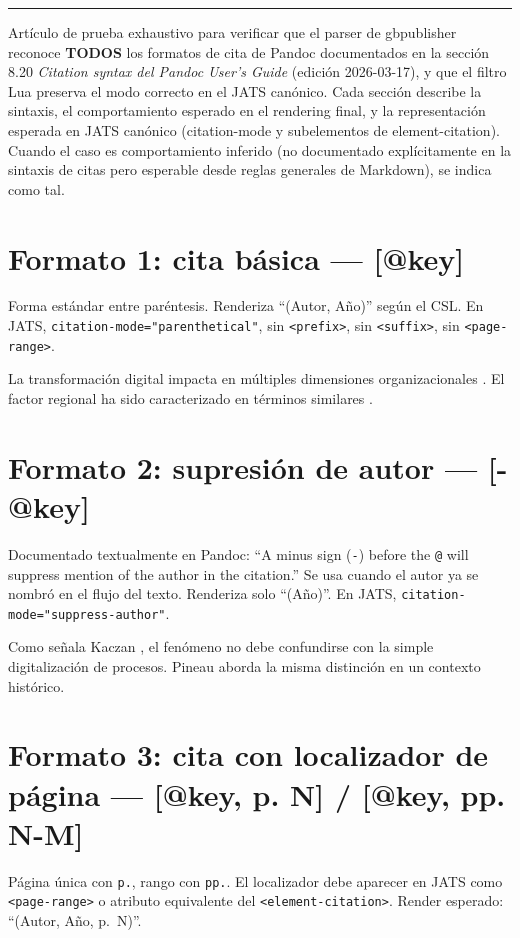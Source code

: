 \documentclass{article}
\begin{document}
\bigskip
\noindent\rule{\linewidth}{0.4pt}
\bigskip

Artículo de prueba exhaustivo para verificar que el parser de gbpublisher reconoce \textbf{TODOS} los formatos de cita de Pandoc documentados en la sección 8.20 \textit{Citation syntax del Pandoc User’s Guide} (edición 2026-03-17), y que el filtro Lua preserva el modo correcto en el JATS canónico. Cada sección describe la sintaxis, el comportamiento esperado en el rendering final, y la representación esperada en JATS canónico (citation-mode y subelementos de element-citation). Cuando el caso es comportamiento inferido (no documentado explícitamente en la sintaxis de citas pero esperable desde reglas generales de Markdown), se indica como tal.


\section{Formato 1: cita básica — [@key]}
Forma estándar entre paréntesis. Renderiza “(Autor, Año)” según el CSL. En JATS, \texttt{citation-mode="parenthetical"}, sin \texttt{<prefix>}, sin \texttt{<suffix>}, sin \texttt{<page-range>}.

La transformación digital impacta en múltiples dimensiones organizacionales \autocite{2961-KACZAN2016}. El factor regional ha sido caracterizado en términos similares \autocite{3036-ORBUCH2020}.


\section{Formato 2: supresión de autor — [-@key]}
Documentado textualmente en Pandoc: “A minus sign (\texttt{-}) before the \texttt{@} will suppress mention of the author in the citation.” Se usa cuando el autor ya se nombró en el flujo del texto. Renderiza solo “(Año)”. En JATS, \texttt{citation-mode="suppress-author"}.

Como señala Kaczan \autocite*{2961-KACZAN2016}, el fenómeno no debe confundirse con la simple digitalización de procesos. Pineau \autocite*{3041-PINEAU1999} aborda la misma distinción en un contexto histórico.


\section{Formato 3: cita con localizador de página — [@key, p. N] / [@key, pp. N-M]}
Página única con \texttt{p.}, rango con \texttt{pp.}. El localizador debe aparecer en JATS como \texttt{<page-range>} o atributo equivalente del \texttt{<element-citation>}. Render esperado: “(Autor, Año, p. N)”.
\end{document}
